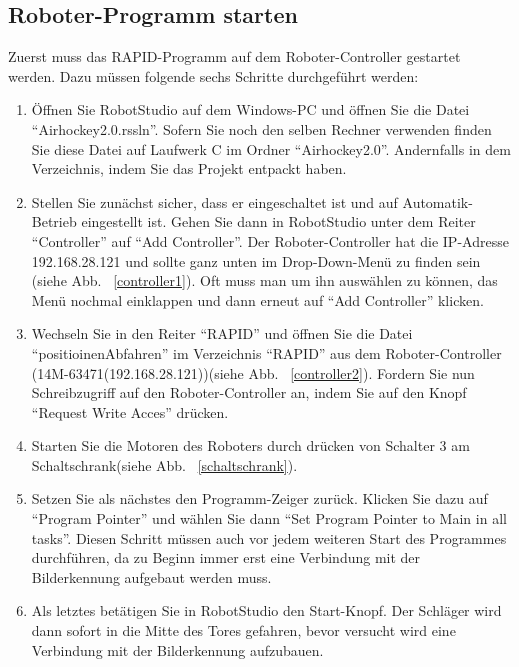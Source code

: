 \subsection{Roboter-Programm starten} 
Zuerst muss das RAPID-Programm auf dem Roboter-Controller gestartet werden. Dazu müssen folgende sechs Schritte durchgeführt werden:  
\begin{enumerate}
\item Öffnen Sie RobotStudio auf dem Windows-PC und öffnen Sie die Datei \enquote{Airhockey2.0.rssln}. Sofern Sie noch den selben Rechner verwenden finden Sie diese Datei auf Laufwerk C im Ordner \enquote{Airhockey2.0}. Andernfalls in dem Verzeichnis, indem Sie das Projekt entpackt haben. 

\item Stellen Sie zunächst sicher, dass er eingeschaltet ist und auf Automatik-Betrieb eingestellt ist. Gehen Sie dann in RobotStudio unter dem Reiter \enquote{Controller} auf \enquote{Add Controller}. Der Roboter-Controller hat die IP-Adresse 192.168.28.121 und sollte ganz unten im Drop-Down-Menü zu finden sein (siehe Abb. ~\ref{controller1}). Oft muss man um ihn auswählen zu können, das Menü nochmal einklappen und dann erneut auf \enquote{Add Controller} klicken.

\item Wechseln Sie in den Reiter \enquote{RAPID} und öffnen Sie die Datei \enquote{positioinenAbfahren} im Verzeichnis \enquote{RAPID} aus dem Roboter-Controller (14M-63471(192.168.28.121))(siehe Abb. ~\ref{controller2}). Fordern Sie nun Schreibzugriff auf den Roboter-Controller an, indem Sie auf den Knopf \enquote{Request Write Acces} drücken. 

\item Starten Sie die Motoren des Roboters durch drücken von Schalter 3 am Schaltschrank(siehe Abb. ~\ref{schaltschrank}).

\item Setzen Sie als nächstes den Programm-Zeiger zurück. Klicken Sie dazu auf \enquote{Program Pointer} und wählen Sie dann \enquote{Set Program Pointer to Main in all tasks}. Diesen Schritt müssen auch vor jedem weiteren Start des Programmes durchführen, da zu Beginn immer erst eine Verbindung mit der Bilderkennung aufgebaut werden muss.

\item Als letztes betätigen Sie in RobotStudio den Start-Knopf. Der Schläger wird dann sofort in die Mitte des Tores gefahren, bevor versucht wird eine Verbindung mit der Bilderkennung aufzubauen.    
\end{enumerate}

